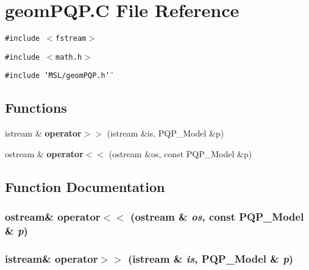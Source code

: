 \section{geom\-PQP.C File Reference}
\label{geomPQP_8C}
{\tt \#include $<$fstream$>$}\par
{\tt \#include $<$math.h$>$}\par
{\tt \#include \char`\"{}MSL/geom\-PQP.h\char`\"{}}\par
\subsection*{Functions}
\begin{CompactItemize}
\item 
istream \& {\bf operator$>$$>$} (istream \&is, PQP\_\-Model \&p)
\item 
ostream \& {\bf operator$<$$<$} (ostream \&os, const PQP\_\-Model \&p)
\end{CompactItemize}


\subsection{Function Documentation}
\subsubsection{\setlength{\rightskip}{0pt plus 5cm}ostream\& operator$<$$<$ (ostream \& {\em os}, const PQP\_\-Model \& {\em p})}\label{geomPQP_8C_a1}


\subsubsection{\setlength{\rightskip}{0pt plus 5cm}istream\& operator$>$$>$ (istream \& {\em is}, PQP\_\-Model \& {\em p})}\label{geomPQP_8C_a0}



